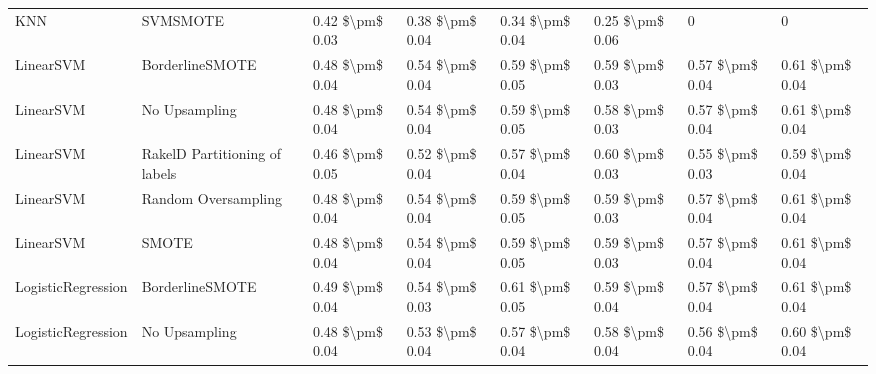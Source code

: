 \begin{tabular}{llllllll}
                            KNN &                      SVMSMOTE & 0.42 \$\textbackslash pm\$ 0.03 &           0.38 \$\textbackslash pm\$ 0.04 &       0.34 \$\textbackslash pm\$ 0.04 &        0.25 \$\textbackslash pm\$ 0.06 &                                       0 &                   0 \\
                      LinearSVM &               BorderlineSMOTE & 0.48 \$\textbackslash pm\$ 0.04 &           0.54 \$\textbackslash pm\$ 0.04 &       0.59 \$\textbackslash pm\$ 0.05 &        0.59 \$\textbackslash pm\$ 0.03 &                         0.57 \$\textbackslash pm\$ 0.04 &     0.61 \$\textbackslash pm\$ 0.04 \\
                      LinearSVM &                 No Upsampling & 0.48 \$\textbackslash pm\$ 0.04 &           0.54 \$\textbackslash pm\$ 0.04 &       0.59 \$\textbackslash pm\$ 0.05 &        0.58 \$\textbackslash pm\$ 0.03 &                         0.57 \$\textbackslash pm\$ 0.04 &     0.61 \$\textbackslash pm\$ 0.04 \\
                      LinearSVM & RakelD Partitioning of labels & 0.46 \$\textbackslash pm\$ 0.05 &           0.52 \$\textbackslash pm\$ 0.04 &       0.57 \$\textbackslash pm\$ 0.04 &        0.60 \$\textbackslash pm\$ 0.03 &                         0.55 \$\textbackslash pm\$ 0.03 &     0.59 \$\textbackslash pm\$ 0.04 \\
                      LinearSVM &           Random Oversampling & 0.48 \$\textbackslash pm\$ 0.04 &           0.54 \$\textbackslash pm\$ 0.04 &       0.59 \$\textbackslash pm\$ 0.05 &        0.59 \$\textbackslash pm\$ 0.03 &                         0.57 \$\textbackslash pm\$ 0.04 &     0.61 \$\textbackslash pm\$ 0.04 \\
                      LinearSVM &                         SMOTE & 0.48 \$\textbackslash pm\$ 0.04 &           0.54 \$\textbackslash pm\$ 0.04 &       0.59 \$\textbackslash pm\$ 0.05 &        0.59 \$\textbackslash pm\$ 0.03 &                         0.57 \$\textbackslash pm\$ 0.04 &     0.61 \$\textbackslash pm\$ 0.04 \\
             LogisticRegression &               BorderlineSMOTE & 0.49 \$\textbackslash pm\$ 0.04 &           0.54 \$\textbackslash pm\$ 0.03 &       0.61 \$\textbackslash pm\$ 0.05 &        0.59 \$\textbackslash pm\$ 0.04 &                         0.57 \$\textbackslash pm\$ 0.04 &     0.61 \$\textbackslash pm\$ 0.04 \\
             LogisticRegression &                 No Upsampling & 0.48 \$\textbackslash pm\$ 0.04 &           0.53 \$\textbackslash pm\$ 0.04 &       0.57 \$\textbackslash pm\$ 0.04 &        0.58 \$\textbackslash pm\$ 0.04 &                         0.56 \$\textbackslash pm\$ 0.04 &     0.60 \$\textbackslash pm\$ 0.04 \\

\end{tabular}
